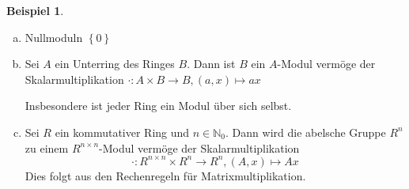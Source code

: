 \documentclass[
twoside=semi,
fontsize=12,
DIV=12, 
cleardoublepage=current,
leqno,
headings=optiontoheadandtoc, 
toc=idx
]{scrbook}
\newcommand{\N}{\mathbb{N}}
\newcommand{\set}[1]{\left\{ #1 \right\}}
\theoremstyle{definition}
\newtheorem{beispiel}[definition]{Beispiel}
\begin{document}
	\begin{beispiel}\label{1.1.3}\hfill
			\begin{enumerate}[(a)]
			\item Nullmoduln $\set{0}$
			
			\item Sei $A$ ein Unterring des Ringes $B$. Dann ist $B$ ein $A$-Modul verm\"oge der Skalarmultiplikation $\cdot: A \times B \to B, (a, x) \mapsto ax$
			
			Insbesondere ist jeder Ring ein Modul \"uber sich selbst.
			
			\item Sei $R$ ein kommutativer Ring und $n \in \N_0$. Dann wird die abelsche Gruppe $R^n$ zu einem $R^{n\times n}$-Modul verm\"oge der Skalarmultiplikation
			\[\cdot: R^{n\times n} \times R^n \to R^n, (A, x) \mapsto Ax\]
			Dies folgt aus den Rechenregeln f\"ur Matrixmultiplikation.
		\end{enumerate}
	\end{beispiel}
	
\end{document}
